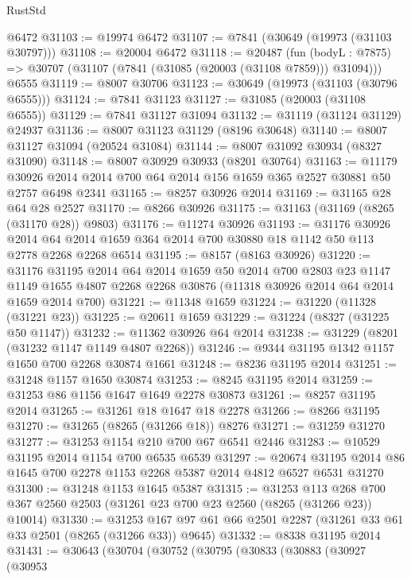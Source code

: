 \begin{lexlean}{RustStd}
\begin{coremodule}
{\begin{coremodule}
{{{{{{{{{{{{{{{{{{{{{{{{{{{{{{{{{{{{{{{{{{{{{{{{{{{{{{    @6472
@31103 := @19974 @6472
@31107 := @7841 (@30649 (@19973 (@31103 @30797)))
@31108 := @20004 @6472
@31118 := @20487
    (fun (bodyL : @7875) => @30707 (@31107 (@7841 (@31085 (@20003 (@31108 @7859))) @31094)))
    @6555
@31119 := @8007 @30706
@31123 := @30649 (@19973 (@31103 (@30796 @6555)))
@31124 := @7841 @31123
@31127 := @31085 (@20003 (@31108 @6555))
@31129 := @7841 @31127 @31094
@31132 := @31119 (@31124 @31129) @24937
@31136 := @8007 @31123 @31129 (@8196 @30648)
@31140 := @8007 @31127 @31094 (@20524 @31084)
@31144 := @8007 @31092 @30934 (@8327 @31090)
@31148 := @8007 @30929 @30933 (@8201 @30764)
@31163 := @11179
    @30926
    @2014
    @2014
    @700
    @64
    @2014
    @156
    @1659
    @365
    @2527
    @30881
    @50
    @2757
    @6498
    @2341
@31165 := @8257 @30926 @2014
@31169 := @31165 @28 @64 @28 @2527
@31170 := @8266 @30926
@31175 := @31163 (@31169 (@8265 (@31170 @28)) @9803)
@31176 := @11274 @30926
@31193 := @31176
    @30926
    @2014
    @64
    @2014
    @1659
    @364
    @2014
    @700
    @30880
    @18
    @1142
    @50
    @113
    @2778
    @2268
    @2268
    @6514
@31195 := @8157 (@8163 @30926)
@31220 := @31176
    @31195
    @2014
    @64
    @2014
    @1659
    @50
    @2014
    @700
    @2803
    @23
    @1147
    @1149
    @1655
    @4807
    @2268
    @2268
    @30876
    (@11318 @30926 @2014 @64 @2014 @1659 @2014 @700)
@31221 := @11348 @1659
@31224 := @31220 (@11328 (@31221 @23))
@31225 := @20611 @1659
@31229 := @31224 (@8327 (@31225 @50 @1147))
@31232 := @11362 @30926 @64 @2014
@31238 := @31229 (@8201 (@31232 @1147 @1149 @4807 @2268))
@31246 := @9344 @31195 @1342 @1157 @1650 @700 @2268 @30874 @1661
@31248 := @8236 @31195 @2014
@31251 := @31248 @1157 @1650 @30874
@31253 := @8245 @31195 @2014
@31259 := @31253 @86 @1156 @1647 @1649 @2278 @30873
@31261 := @8257 @31195 @2014
@31265 := @31261 @18 @1647 @18 @2278
@31266 := @8266 @31195
@31270 := @31265 (@8265 (@31266 @18)) @8276
@31271 := @31259 @31270
@31277 := @31253 @1154 @210 @700 @67 @6541 @2446
@31283 := @10529 @31195 @2014 @1154 @700 @6535 @6539
@31297 := @20674 @31195 @2014 @86 @1645 @700 @2278 @1153 @2268 @5387 @2014 @4812 @6527 @6531 @31270
@31300 := @31248 @1153 @1645 @5387
@31315 := @31253
    @113
    @268
    @700
    @367
    @2560
    @2503
    (@31261 @23 @700 @23 @2560 (@8265 (@31266 @23)) @10014)
@31330 := @31253 @167 @97 @61 @66 @2501 @2287 (@31261 @33 @61 @33 @2501 (@8265 (@31266 @33)) @9645)
@31332 := @8338 @31195 @2014
@31431 := @30643
    (@30704
      (@30752
        (@30795
          (@30833
            (@30883
              (@30927
                (@30953
}}}}}}}}}}}}}}}}}}}}}}}}}}}}}}}}}}}}}}}}}}}}}}}}}}}}}}
\end{coremodule}}
\end{coremodule}
\end{lexlean}
